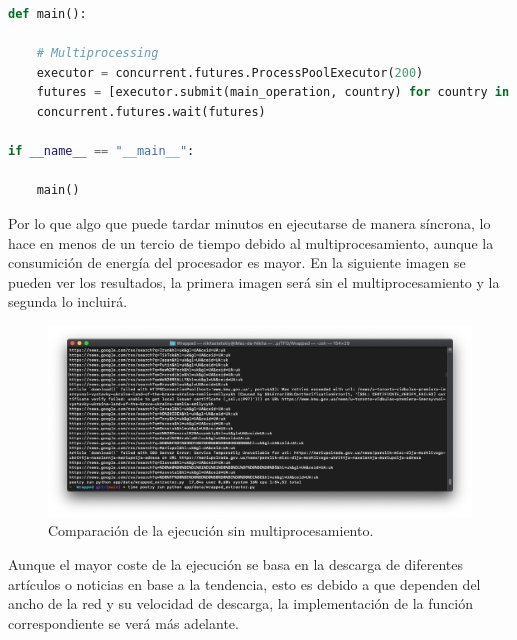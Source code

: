 \vspace{0.3cm}

\begin{lstlisting}[caption=Ejecución con multiprocesamiento,          label={lst:listing-python},language=Python]
def main():

    # Multiprocessing
    executor = concurrent.futures.ProcessPoolExecutor(200)
    futures = [executor.submit(main_operation, country) for country in COUNTRIES]
    concurrent.futures.wait(futures)

if __name__ == "__main__":

    main()
\end{lstlisting}


Por lo que algo que puede tardar minutos en ejecutarse de manera síncrona, lo hace en menos de un tercio de tiempo debido al multiprocesamiento, aunque la consumición de energía del procesador es mayor. En la siguiente imagen se pueden ver los resultados, la primera imagen será sin el multiprocesamiento y la segunda lo incluirá.

\begin{figure}[H]
    \centering
    \myfloatalign
    \includegraphics[width=1\textwidth]{gfx/comparacion-multiprocesamiento.png}
    \caption[Comparación de la ejecución sin multiprocesamiento]{Comparación de la ejecución sin multiprocesamiento.}\label{gfx:comparacion-multiprocesamiento}
\end{figure}

Aunque el mayor coste de la ejecución se basa en la descarga de diferentes artículos o noticias en base a la tendencia, esto es debido a que dependen del ancho de la red y su velocidad de descarga, la implementación de la función correspondiente se verá más adelante.

